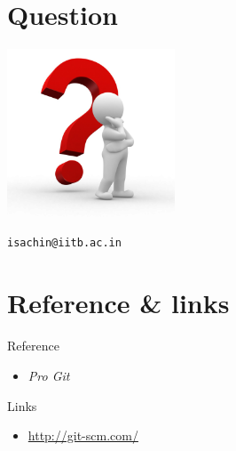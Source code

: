 \documentclass[bigger, presentation]{beamer}
\begin{document}
\section{Question}
\label{sec-13}
\begin{frame}[fragile]

   \includegraphics[width=5cm,angle=0]{./questions.png}
   

\begin{verbatim}
isachin@iitb.ac.in
\end{verbatim}
\end{frame}
\section{Reference \& links}
\label{sec-14}
\begin{frame}
\begin{block}{Reference}
\label{sec-14-1-1}

\begin{itemize}
\item \emph{Pro Git}
\end{itemize}
\end{block}
\begin{block}{Links}
\label{sec-14-1-2}

\begin{itemize}
\item \href{http://www.emacswiki.org/emacs/}{http://git-scm.com/}
\end{itemize}
\end{block}
\end{frame}
\end{document}
